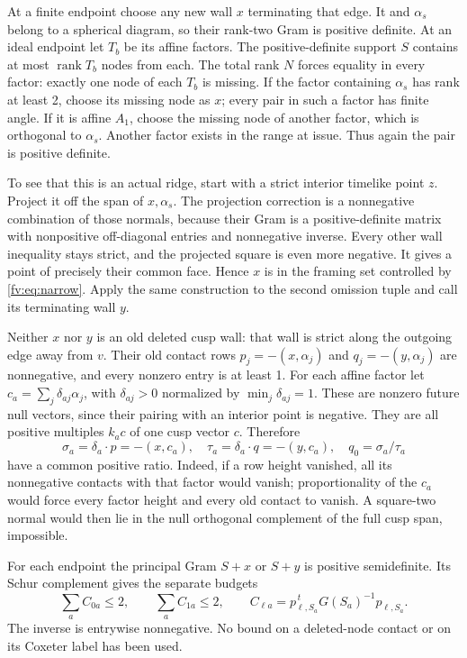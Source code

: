 \documentclass[11pt]{article}
\theoremstyle{remark}\newtheorem{remark}[theorem]{Remark}
\numberwithin{equation}{section}
\begin{document}
At a finite endpoint choose any new wall $x$ terminating that edge.
It and $\alpha_s$ belong to a spherical diagram, so their rank-two
Gram is positive definite. At an ideal endpoint let $T_b$ be its
affine factors. The positive-definite support $S$ contains at most
 $\operatorname{rank}T_b$ nodes from each. The total rank $N$ forces
equality in every factor: exactly one node of each $T_b$ is missing.
If the factor containing $\alpha_s$ has rank at least 2, choose its
missing node as $x$; every pair in such a factor has finite angle.
If it is affine $A_1$, choose the missing node of another factor,
which is orthogonal to $\alpha_s$. Another factor exists in the
range at issue. Thus again the pair is positive definite.

To see that this is an actual ridge, start with a strict interior
timelike point $z$. Project it off the span of $x,\alpha_s$.
The projection correction is a nonnegative combination of those
normals, because their Gram is a positive-definite matrix with
nonpositive off-diagonal entries and nonnegative inverse.
Every other wall inequality stays strict, and the projected square
is even more negative. It gives a point of precisely their common
face. Hence $x$ is in the framing set controlled by
\eqref{fv:eq:narrow}. Apply the same construction to the second
omission tuple and call its terminating wall $y$.

Neither $x$ nor $y$ is an old deleted cusp wall: that wall is strict
along the outgoing edge away from $v$. Their old contact rows
 $p_j=-(x,\alpha_j)$ and $q_j=-(y,\alpha_j)$ are nonnegative,
and every nonzero entry is at least 1. For each affine factor let
 $c_a=\sum_j\delta_{aj}\alpha_j$, with $\delta_{aj}>0$ normalized
by $\min_j\delta_{aj}=1$. These are nonzero future null vectors,
since their pairing with an interior point is negative. They are
all positive multiples $k_ac$ of one cusp vector $c$. Therefore
 \[
 \sigma_a=\delta_a\cdot p=-(x,c_a),\quad
 \tau_a=\delta_a\cdot q=-(y,c_a),\quad
 q_0=\sigma_a/\tau_a
\]
have a common positive ratio. Indeed, if a row height vanished,
all its nonnegative contacts with that factor would vanish;
proportionality of the $c_a$ would force every factor height and
every old contact to vanish. A square-two normal would then lie
in the null orthogonal complement of the full cusp span, impossible.

For each endpoint the principal Gram $S+x$ or $S+y$ is positive
semidefinite. Its Schur complement gives the separate budgets
 \begin{equation}\label{fv:eq:two-budgets}
 \sum_aC_{0a}\le2,\qquad\sum_aC_{1a}\le2,\qquad
 C_{\ell a}=p_{\ell,S_a}^{\,t}G(S_a)^{-1}p_{\ell,S_a}.
\end{equation}
The inverse is entrywise nonnegative. No bound on a deleted-node
contact or on its Coxeter label has been used.
\end{document}
